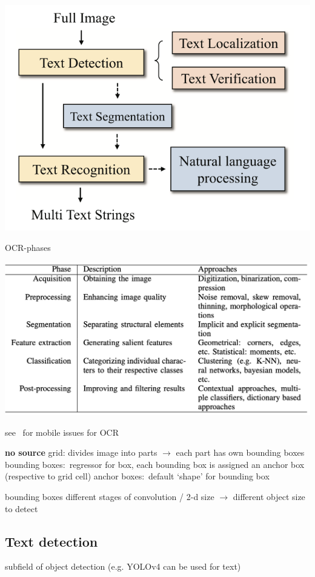 \includegraphics[width=\textwidth]{img/OCR-Pipeline.png}

OCR-phases~\cite{sourvanos_challenges_2018}

\includegraphics[width=\textwidth]{img/OCR-Phases.png}

see~\cite{sourvanos_challenges_2018} for mobile issues for \ac{OCR}

\textbf{no source}
grid: divides image into parts $\rightarrow$ each part has own bounding boxes
bounding boxes:~regressor for box, each bounding box is assigned an anchor box (respective to grid cell)
anchor boxes:~default `shape' for bounding box

bounding boxes different stages of convolution / 2-d size $\rightarrow$ different object size to detect

\subsection*{Text detection}
subfield of object detection (e.g. YOLOv4 can be used for text)

